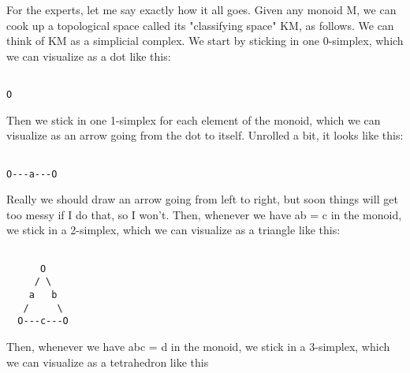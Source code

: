 For the experts, let me say exactly how it all goes.  Given any monoid M,
we can cook up a topological space called its "classifying space" KM,
as follows. We can think of KM as a simplicial complex.  We start by
sticking in one 0-simplex, which we can visualize as a dot like this:

\begin{verbatim}

O
\end{verbatim}
    
Then we stick in one 1-simplex for each element of the monoid, which we
can visualize as an arrow going from the dot to itself.  Unrolled a bit,
it looks like this: 

\begin{verbatim}

O---a---O
\end{verbatim}
    
Really we should draw an arrow going from left to right, but soon
things will get too messy if I do that, so I won't.  Then, whenever we
have ab = c in the monoid, we stick in a 2-simplex, which we can
visualize as a triangle like this:

\begin{verbatim}

      O
     / \
    a   b
   /     \
  O---c---O
\end{verbatim}
    
Then, whenever we have abc = d in the monoid, we stick in a 3-simplex,
which we can visualize as a tetrahedron like this

